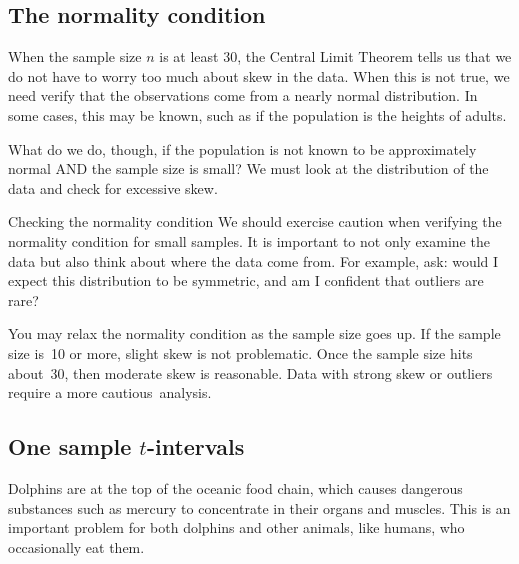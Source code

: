 \subsection{The normality condition}
\label{normalityCond}

When the sample size $n$ is at least 30, the Central Limit Theorem tells us that we do not have to worry too much about skew in the data. When this is not true, we need verify that the observations come from a nearly normal distribution. In some cases, this may be known, such as if the population is the heights of adults.

What do we do, though, if the population is not known to be approximately normal AND the sample size is small?  We must look at the distribution of the data and check for excessive skew.

\begin{caution}{Checking the normality condition}
{We should exercise caution when verifying the normality condition for small samples. It is important to not only examine the data but also think about where the data come from. For example, ask: would I expect this distribution to be symmetric, and am I confident that outliers are rare?}
\end{caution}

You may relax the normality condition as the sample size goes up. If the sample size is~10 or more, slight skew is not problematic. Once the sample size hits about~30, then moderate skew is reasonable. Data with strong skew or outliers require a more \mbox{cautious analysis.}


\subsection{One sample $t$-intervals}
\label{oneSampleTConfidenceIntervals}

Dolphins are at the top of the oceanic food chain, which causes dangerous substances such as mercury to concentrate in their organs and muscles. This is an important problem for both dolphins and other animals, like humans, who occasionally eat them.
\setlength{\captionwidth}{86mm}


